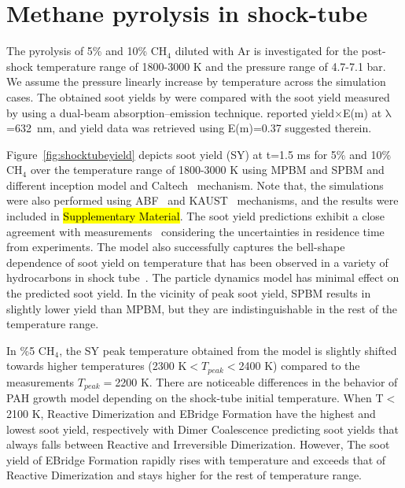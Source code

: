 \section{Methane pyrolysis in shock-tube}

The pyrolysis of 5\% and 10\% $\mathrm{CH_4}$ diluted with Ar is investigated for the post-shock temperature range of 1800-3000 K and the pressure range of 4.7-7.1 bar. We assume the pressure linearly increase by temperature across the simulation cases. The obtained soot yields by were compared with the soot yield measured by \citet{agafonov2016unified} using a dual-beam absorption–emission technique. \citet{agafonov2016unified} reported yield$\times$E(m) at $\mathrm{\lambda}$=632~nm, and yield data was retrieved using E(m)=0.37 suggested therein. 






Figure~\ref{fig:shocktubeyield} depicts soot yield (SY) at t=1.5 ms for 5\% and 10\% $\mathrm{CH_4}$ over the temperature range of 1800-3000 K using MPBM and SPBM and different inception model and Caltech~\citep{blanquart2009chemical} mechanism. Note that, the simulations were also performed using ABF~\citep{appel2000kinetic} and KAUST~\cite{wang2013pah} mechanisms, and the results were included in \hl{Supplementary Material}. The soot yield predictions exhibit a close agreement with measurements~\citep{agafonov2016unified} considering the uncertainties in residence time from experiments. The model also successfully captures the bell-shape dependence of soot yield on temperature that has been observed in a variety of hydrocarbons in shock tube~\citep{kellerer1996soot,knorre1996soot}. The particle dynamics model has minimal effect on the predicted soot yield. In the vicinity of peak soot yield, SPBM results in slightly lower yield than MPBM, but they are indistinguishable in the rest of the temperature range. 

In \%5 $\mathrm{CH_4}$, the SY peak temperature obtained from the model is slightly shifted towards higher temperatures (2300 K$<T_{peak}<$2400 K) compared to the measurements $T_{peak}=$2200 K. There are noticeable differences in the behavior of PAH growth model depending on the shock-tube initial temperature. When T$<$2100 K, Reactive Dimerization and EBridge Formation have the highest and lowest soot yield, respectively with Dimer Coalescence predicting soot yields that always falls between Reactive and Irreversible Dimerization. However, The soot yield of EBridge Formation rapidly rises with temperature and exceeds that of Reactive Dimerization and stays higher for the rest of temperature range.

